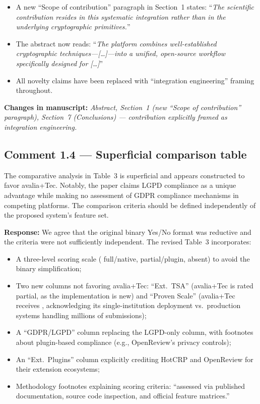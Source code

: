 \documentclass[11pt,a4paper]{article}
\newcommand{\response}[1]{\par\noindent\textcolor{responsecolor}{\textbf{Response:}} #1}
\newcommand{\change}[1]{\par\noindent\textcolor{changecolor}{\textbf{Changes in manuscript:}} \textit{#1}}
\begin{document}
\begin{itemize}[nosep]
  \item A new ``Scope of contribution'' paragraph in Section~1 states: ``\textit{The scientific contribution resides in this systematic integration rather than in the underlying cryptographic primitives.}''
  \item The abstract now reads: ``\textit{The platform combines well-established cryptographic techniques---[\ldots]---into a unified, open-source workflow specifically designed for [\ldots]}''
  \item All novelty claims have been replaced with ``integration engineering'' framing throughout.
\end{itemize}

\change{Abstract, Section~1 (new ``Scope of contribution'' paragraph), Section~7 (Conclusions) --- contribution explicitly framed as integration engineering.}

\bigskip

\subsection*{Comment 1.4 --- Superficial comparison table}

\begin{reviewerbox}
The comparative analysis in Table~3 is superficial and appears constructed to favor avalia+Tec. Notably, the paper claims LGPD compliance as a unique advantage while making no assessment of GDPR compliance mechanisms in competing platforms. The comparison criteria should be defined independently of the proposed system's feature set.
\end{reviewerbox}

\response{We agree that the original binary Yes/No format was reductive and the criteria were not sufficiently independent. The revised Table~3 incorporates:}

\begin{itemize}[nosep]
  \item A three-level scoring scale ( full/native,  partial/plugin,  absent) to avoid the binary simplification;
  \item Two new columns not favoring avalia+Tec: ``Ext.\ TSA'' (avalia+Tec is rated  partial, as the implementation is new) and ``Proven Scale'' (avalia+Tec receives , acknowledging its single-institution deployment vs.\ production systems handling millions of submissions);
  \item A ``GDPR/LGPD'' column replacing the LGPD-only column, with footnotes about plugin-based compliance (e.g., OpenReview's privacy controls);
  \item An ``Ext.\ Plugins'' column explicitly crediting HotCRP and OpenReview for their extension ecosystems;
  \item Methodology footnotes explaining scoring criteria: ``assessed via published documentation, source code inspection, and official feature matrices.''
\end{itemize}
\end{document}
